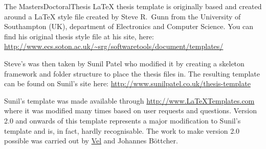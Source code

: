 The MastersDoctoralThesis LaTeX thesis template is originally based and created around a LaTeX style file created by Steve R.\ Gunn from the University of Southampton (UK), department of Electronics and Computer Science. You can find his original thesis style file at his site, here:
\url{http://www.ecs.soton.ac.uk/~srg/softwaretools/document/templates/}

Steve's  was then taken by Sunil Patel who modified it by creating a skeleton framework and folder structure to place the thesis files in. The resulting template can be found on Sunil's site here:
\url{http://www.sunilpatel.co.uk/thesis-template}

Sunil's template was made available through \url{http://www.LaTeXTemplates.com} where it was modified many times based on user requests and questions. Version 2.0 and onwards of this template represents a major modification to Sunil's template and is, in fact, hardly recognisable. The work to make version 2.0 possible was carried out by \href{mailto:vel@latextemplates.com}{Vel} and Johannes Böttcher.
